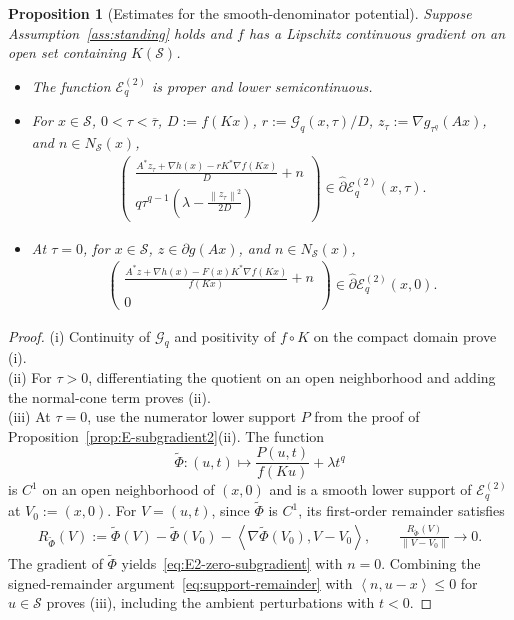 \documentclass[9pt]{article}
\numberwithin{equation}{section}
\newtheorem{proposition}[theorem]{Proposition}
\theoremstyle{definition}
\theoremstyle{remark}
\newcommand{\Sset}{\mathcal S}
\newcommand{\whpartial}{\widehat\partial}
\newcommand{\norm}[1]{\left\lVert #1\right\rVert}
\newcommand{\ip}[2]{\left\langle #1,#2\right\rangle}
\newcommand{\Gcal}{\mathcal G}
\newcommand{\Ecal}{\mathcal E}
\begin{document}
\begin{proposition}[Estimates for the smooth-denominator potential]
\label{prop:smooth-potential}
Suppose Assumption~\ref{ass:standing} holds and $f$ has a Lipschitz
continuous gradient on an open set containing $K(\Sset)$.
\begin{itemize}
\item[(i)] The function $\Ecal_q^{(2)}$ is proper and lower semicontinuous.
\item[(ii)] For $x\in\Sset$, $0<\tau<\overline\tau$,
$D:=f(Kx)$, $r:=\Gcal_q(x,\tau)/D$,
$z_\tau:=\nabla g_{\tau^q}(Ax)$, and $n\in N_{\Sset}(x)$,
\begin{eqnarray}\label{eq:E2-positive-subgradient}
 \begin{pmatrix}
 \displaystyle\frac{A^*z_\tau+\nabla h(x)-rK^*\nabla f(Kx)}{D}+n\\[1.5ex]
 \displaystyle q\tau^{q-1}
           \left(\lambda-\frac{\norm{z_\tau}^2}{2D}\right)
 \end{pmatrix}
 \in\whpartial\Ecal_q^{(2)}(x,\tau).
\end{eqnarray}
\item[(iii)] At $\tau=0$, for $x\in\Sset$,
$z\in\partial g(Ax)$, and $n\in N_{\Sset}(x)$,
\begin{eqnarray}\label{eq:E2-zero-subgradient}
 \begin{pmatrix}
 \displaystyle\frac{A^*z+\nabla h(x)-F(x)K^*\nabla f(Kx)}{f(Kx)}+n\\[1.5ex]
 0
 \end{pmatrix}
 \in\whpartial\Ecal_q^{(2)}(x,0).
\end{eqnarray}
\end{itemize}
\end{proposition}
\begin{proof}
(i) Continuity of $\Gcal_q$ and positivity of $f\circ K$ on the compact
domain prove (i).\\
(ii) For $\tau>0$, differentiating the quotient
on an open neighborhood and adding the normal-cone term proves (ii).\\
(iii) At $\tau=0$, use the numerator lower support $P$ from the proof
of Proposition~\ref{prop:E-subgradient2}(ii). The function
\[
\widetilde\Phi:(u,t)\longmapsto\frac{P(u,t)}{f(Ku)}+\lambda t^q
\]
is $C^1$ on an open neighborhood of $(x,0)$ and is a smooth
lower support of $\Ecal_q^{(2)}$ at $V_0:=(x,0)$.
For $V=(u,t)$, since $\widetilde\Phi$ is $C^1$, its first-order remainder satisfies
\begin{eqnarray}\label{eq:Psi-remainder}
 R_{\widetilde\Phi}(V):=\widetilde\Phi(V)-\widetilde\Phi(V_0)
                 -\ip{\nabla\widetilde\Phi(V_0)}{V-V_0},
 \qquad
 \frac{R_{\widetilde\Phi}(V)}{\norm{V-V_0}}\longrightarrow0.
\end{eqnarray}
The gradient of $\widetilde\Phi$ yields~\eqref{eq:E2-zero-subgradient} with $n=0$.
Combining the signed-remainder argument~\eqref{eq:support-remainder}
with $\ip n{u-x}\leq0$ for $u\in\Sset$ proves (iii), including the
ambient perturbations with $t<0$.
\end{proof}
\end{document}
